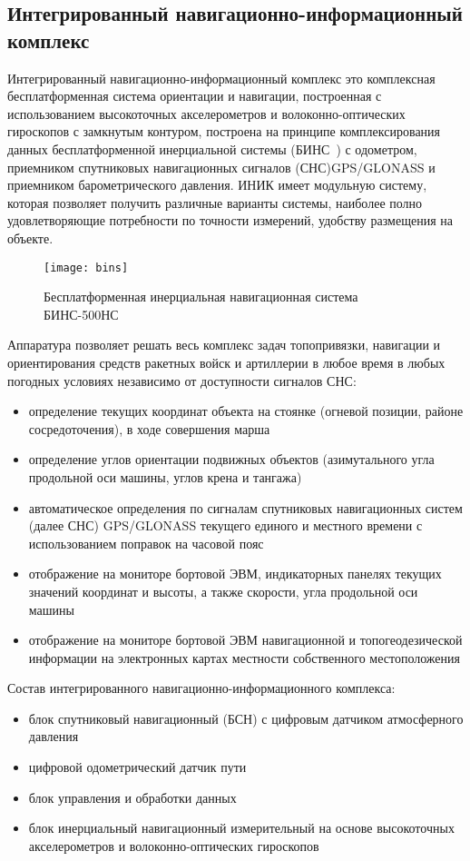 \subsection{Интегрированный навигационно-информационный комплекс}
\label{sub:lit_review:ins}

Интегрированный навигационно-информационный комплекс это комплексная бесплатформенная система ориентации и навигации,
построенная с использованием высокоточных акселерометров и волоконно-оптических гироскопов с замкнутым контуром,
построена на принципе комплексирования данных бесплатформенной инерциальной системы (БИНС~\cite{bins500}) с одометром, приемником спутниковых навигационных сигналов (СНС)\break GPS/GLONASS и приемником барометрического давления.
ИНИК имеет модульную систему, которая позволяет получить различные варианты системы, наиболее полно удовлетворяющие потребности по точности измерений, удобству размещения на объекте.

\begin{figure}[ht]
	\centering
	\texttt{[image: bins]}
	\caption{Бесплатформенная инерциальная навигационная система БИНС-500НС~\cite{bins500}}
	\label{fig:lit_reiview:ins:bins}
\end{figure}

Аппаратура позволяет  решать весь комплекс задач топопривязки, навигации и ориентирования средств ракетных войск и артиллерии в любое время в любых погодных условиях независимо от доступности сигналов СНС:
\begin{itemize}
	\item определение текущих координат объекта на стоянке (огневой позиции, районе сосредоточения), в ходе совершения марша
	\item определение углов ориентации подвижных объектов (азимутального угла продольной оси машины, углов крена и тангажа)
	\item автоматическое определения по сигналам спутниковых навигационных систем (далее СНС) GPS/GLONASS текущего единого и местного времени с использованием поправок на часовой пояс
	\item отображение на мониторе бортовой ЭВМ, индикаторных панелях текущих значений координат и высоты, а также скорости, угла продольной оси машины
	\item отображение на мониторе бортовой ЭВМ навигационной и топогеодезической информации на электронных картах местности собственного местоположения
\end{itemize}

Состав интегрированного навигационно-информационного комплекса:
\begin{itemize}
	\item блок спутниковый навигационный (БСН) с цифровым датчиком атмосферного давления
	\item цифровой одометрический датчик пути
	\item блок управления и обработки данных
	\item блок инерциальный навигационный измерительный на основе высокоточных акселерометров и волоконно-оптических гироскопов
\end{itemize}

